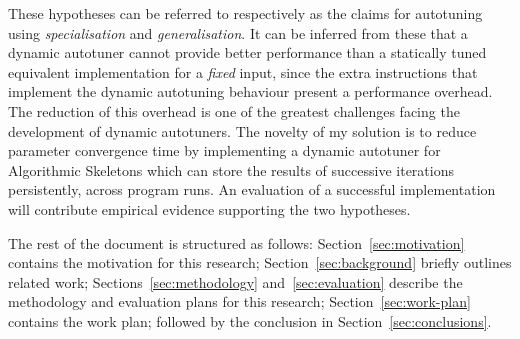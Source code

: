 These hypotheses can be referred to respectively as the claims for
autotuning using \emph{specialisation} and \emph{generalisation}. It
can be inferred from these that a dynamic autotuner cannot provide
better performance than a statically tuned equivalent implementation
for a \emph{fixed} input, since the extra instructions that implement
the dynamic autotuning behaviour present a performance overhead. The
reduction of this overhead is one of the greatest challenges facing
the development of dynamic autotuners. The novelty of my solution is
to reduce parameter convergence time by implementing a dynamic
autotuner for Algorithmic Skeletons which can store the results of
successive iterations persistently, across program runs. An evaluation
of a successful implementation will contribute empirical evidence
supporting the two hypotheses.

The rest of the document is structured as follows:
Section~\ref{sec:motivation} contains the motivation for this
research; Section~\ref{sec:background} briefly outlines related work;
Sections~\ref{sec:methodology} and~\ref{sec:evaluation} describe the
methodology and evaluation plans for this research;
Section~\ref{sec:work-plan} contains the work plan; followed by the
conclusion in Section~\ref{sec:conclusions}.





